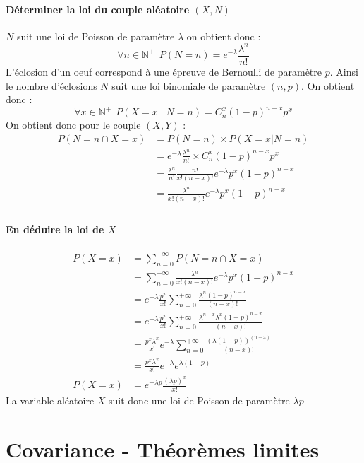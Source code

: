 \documentclass[10pt,a4paper,twoside]{article}
\begin{document}
\subsection{Déterminer la loi du couple aléatoire $(X,N)$}
$N$ suit une loi de Poisson de paramètre $\lambda$ on obtient donc :
\[ \forall n \in \mathbb{N}^{+}\ \ P(N=n)=e^{-\lambda}\frac{\lambda^{n}}{n!}   \]
L'éclosion d'un oeuf correspond à une épreuve de Bernoulli de paramètre $p$. Ainsi le nombre d'éclosions $N$ suit une loi binomiale de paramètre $(n,p)$. On obtient donc :
\[ \forall x \in \mathbb{N}^{+}\ \ P(X=x\mid N=n)= C_{n}^{x} (1-p)^{n-x} p^{x} \]
On obtient donc pour le couple $(X,Y)$ :
\begin{align*}
P(N=n\cap X=x) &= P(N=n) \times P(X=x|N=n)\\
&= e^{-\lambda}\frac{\lambda^{n}}{n!}  \times C_{n}^{x} (1-p)^{n-x} p^{x}\\
&= \frac{\lambda^{n}}{n!}\frac{n!}{x!(n-x)!} e^{-\lambda} p^{x} (1-p)^{n-x}\\
&= \frac{\lambda^{n}}{x!(n-x)!}e^{-\lambda} p^{x} (1-p)^{n-x}\\
\end{align*}

\subsection{En déduire la loi de $X$}
\begin{align*}
P(X=x) &= \sum_{n=0}^{+\infty} P(N=n \cap X=x)\\
&= \sum_{n=0}^{+\infty} \frac{\lambda^{n}}{x!(n-x)!}e^{-\lambda} p^{x} (1-p)^{n-x}\\
&= e^{-\lambda}\frac{p^{x}}{x!} \sum_{n=0}^{+\infty} \frac{\lambda^{n} (1-p)^{n-x}}{(n-x)!}\\
&= e^{-\lambda}\frac{p^{x}}{x!} \sum_{n=0}^{+\infty} \frac{\lambda^{n-x} \lambda^{x} (1-p)^{n-x}}{(n-x)!}\\
&= \frac{p^{x}\lambda^{x}}{x!} e^{-\lambda} \sum_{n=0}^{+\infty} \frac{(\lambda (1-p))^{(n-x)}}{(n-x)!}\\
&= \frac{p^{x}\lambda^{x}}{x!} e^{-\lambda} e^{\lambda(1-p)}\\
P(X=x) &= e^{-\lambda p} \frac{(\lambda p)^{x}}{x!}
\end{align*}
La variable aléatoire $X$ suit donc une loi de Poisson de paramètre $\lambda p$

\newpage
\part{Covariance - Théorèmes limites}
\setcounter{section}{0}
\end{document}
